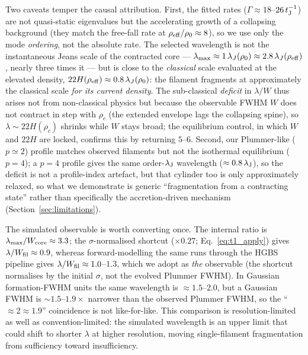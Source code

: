 \documentclass[usenatbib,twoside,twocolumn]{mnras}
\begin{document}
Two caveats temper the causal attribution. First, the fitted rates ($\Gamma\approx18$--$26\,t_{\rm J}^{-1}$) are not quasi-static eigenvalues but the accelerating growth of a collapsing background (they match the free-fall rate at $\rho_{\rm eff}/\rho_0\approx8$), so we use only the mode \emph{ordering}, not the absolute rate. The selected wavelength is not the instantaneous Jeans scale of the contracted core --- $\lambda_{\rm max}\approx1\,\lambda_J(\rho_0)\approx2.8\,\lambda_J(\rho_{\rm eff})$, nearly three times it --- but is close to the \emph{classical} scale evaluated at the elevated density, $22H(\rho_{\rm eff})\approx0.8\,\lambda_J(\rho_0)$: the filament fragments at approximately the classical scale \emph{for its current density}. The sub-classical \emph{deficit} in $\lambda/W$ thus arises not from non-classical physics but because the observable FWHM $W$ does not contract in step with $\rho_c$ (the extended envelope lags the collapsing spine), so $\lambda\sim22H(\rho_c)$ shrinks while $W$ stays broad; the equilibrium control, in which $W$ and $22H$ are locked, confirms this by returning $5$--$6$. Second, our Plummer-like ($p\simeq2$) profile matches observed filaments but not the isothermal equilibrium ($p=4$); a $p=4$ profile gives the same order-$\lambda_{\rm J}$ wavelength ($\approx0.8\,\lambda_{\rm J}$), so the deficit is not a profile-index artefact, but that cylinder too is only approximately relaxed, so what we demonstrate is generic ``fragmentation from a contracting state'' rather than specifically the accretion-driven mechanism (Section~\ref{sec:limitations}).

The simulated observable is worth converting once. The internal ratio is $\lambda_{\rm max}/W_{\rm core}\approx3.3$; the $\sigma$-normalised shortcut ($\times0.27$; Eq.~\ref{eq:t1_apply}) gives $\lambda/W_{\rm fil}\approx0.9$, whereas forward-modelling the same runs through the HGBS pipeline gives $\lambda/W_{\rm fil}\approx1.0$--$1.3$, which we adopt as \emph{the} observable (the shortcut normalises by the initial $\sigma$, not the evolved Plummer FWHM). In Gaussian formation-FWHM units the same wavelength is $\approx1.5$--$2.0$, but a Gaussian FWHM is $\sim1.5$--$1.9\times$ narrower than the observed Plummer FWHM, so the ``$\approx2\approx1.9$'' coincidence is not like-for-like. This comparison is resolution-limited as well as convention-limited: the simulated wavelength is an upper limit that could shift to shorter $\lambda$ at higher resolution, moving single-filament fragmentation from sufficiency toward insufficiency.
\end{document}
